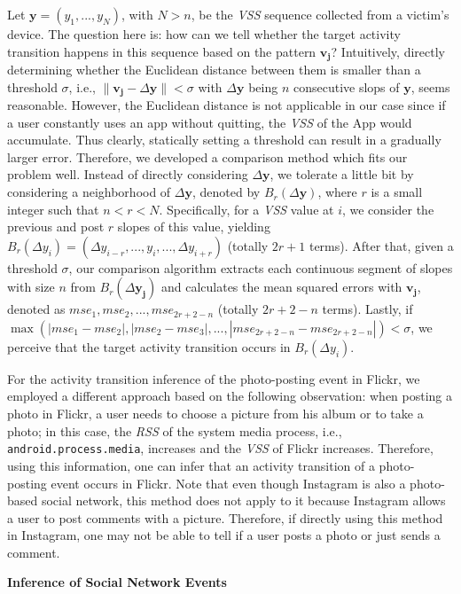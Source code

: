 \documentclass[letterpaper,12pt]{article}
\begin{document}
Let $\mathbf{y}=(y_1,...,y_N)$, with $N>n$, be the \emph{VSS} sequence collected from a victim's device. The question here is: how can we tell whether the target activity transition happens in this sequence based on the pattern $\mathbf{v_j}$? Intuitively, directly determining whether the Euclidean distance  between them is smaller than a threshold $\sigma$, i.e., $\|\mathbf{v_j}-\Delta\mathbf{y}\|<\sigma$ with $\Delta\mathbf{y}$ being $n$  consecutive slops of $\mathbf{y}$, seems reasonable. However, the Euclidean distance is not applicable in our case since if a user constantly uses an app without quitting, the \emph{VSS} of the App would accumulate. Thus clearly, statically setting a threshold can result in a gradually larger error. Therefore, we developed a comparison method which fits our problem well. Instead of directly considering $\Delta\mathbf{y}$, we tolerate a little bit by considering a neighborhood of $\Delta\mathbf{y}$, denoted by $B_{r}(\Delta\mathbf{y})$, where $r$ is a small integer such that $n<r< N$. Specifically, for a \emph{VSS} value at $i$, we consider the previous and post $r$ slopes of this value, yielding $B_{r}(\Delta y_{i})=(\Delta y_{i-r},...,y_{i},...,\Delta y_{i+r})$ (totally $2r+1$ terms). After that, given a threshold $\sigma$, our comparison algorithm extracts each continuous segment of slopes with size $n$ from $B_{r}(\Delta\mathbf{y_j})$ and calculates the mean squared errors with $\mathbf{v_j}$, denoted as $mse_1,mse_2,...,mse_{2r+2-n}$ (totally $2r+2-n$ terms). Lastly, if $\max(|mse_1-mse_2|,|mse_2-mse_3|,...,|mse_{2r+2-n}-mse_{2r+2-n}|)<\sigma$, we perceive that the target activity transition occurs in $B_{r}(\Delta y_{i})$.

For the activity transition inference of the photo-posting event in Flickr, we employed a different approach based on the following observation: when posting a photo in Flickr, a user needs to choose a picture from his album or to take a photo; in this case, the \emph{RSS} of the system media process, i.e., \texttt{android.process.media}, increases and the \emph{VSS} of Flickr increases. Therefore, using this information, one can infer that an activity transition of a photo-posting event occurs in Flickr. Note that even though Instagram is also a photo-based social network, this method does not apply to it because Instagram allows a user to post comments with a picture. Therefore, if directly using this method in Instagram, one may not be able to tell if a user posts a photo or just sends a comment.

\textbf{Inference of Social Network Events}
\end{document}
